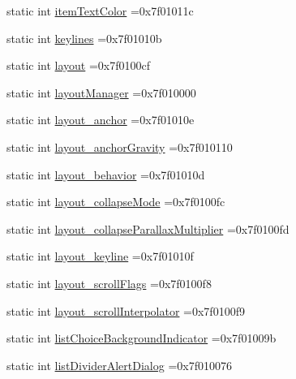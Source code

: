 \begin{DoxyCompactItemize}
\item 
static int \hyperlink{classandroid_1_1support_1_1v4_1_1R_1_1attr_a4281f0a5c0d3ca403f692457be471fe7}{item\+Text\+Color} =0x7f01011c
\item 
static int \hyperlink{classandroid_1_1support_1_1v4_1_1R_1_1attr_a268b3fabe0ef0d9222f43931b0af5d39}{keylines} =0x7f01010b
\item 
static int \hyperlink{classandroid_1_1support_1_1v4_1_1R_1_1attr_a0bf2f94b527cc15b68bf05ba0e93849d}{layout} =0x7f0100cf
\item 
static int \hyperlink{classandroid_1_1support_1_1v4_1_1R_1_1attr_aab150bb5cac4951599a91c59ac183ee5}{layout\+Manager} =0x7f010000
\item 
static int \hyperlink{classandroid_1_1support_1_1v4_1_1R_1_1attr_a1bdef82525d3965c0bfa3c87fa463972}{layout\+\_\+anchor} =0x7f01010e
\item 
static int \hyperlink{classandroid_1_1support_1_1v4_1_1R_1_1attr_a7b903ff169eccd661e399a2c828c411c}{layout\+\_\+anchor\+Gravity} =0x7f010110
\item 
static int \hyperlink{classandroid_1_1support_1_1v4_1_1R_1_1attr_ab0d50824521c62d51d34bec6a94acc92}{layout\+\_\+behavior} =0x7f01010d
\item 
static int \hyperlink{classandroid_1_1support_1_1v4_1_1R_1_1attr_aa4465fd35e82a6ccfec13236de2e46fc}{layout\+\_\+collapse\+Mode} =0x7f0100fc
\item 
static int \hyperlink{classandroid_1_1support_1_1v4_1_1R_1_1attr_a580876bd2ce4e2bd2d19c57ed9f91af1}{layout\+\_\+collapse\+Parallax\+Multiplier} =0x7f0100fd
\item 
static int \hyperlink{classandroid_1_1support_1_1v4_1_1R_1_1attr_aa53f79e9969f32f33d11ad397f0b687b}{layout\+\_\+keyline} =0x7f01010f
\item 
static int \hyperlink{classandroid_1_1support_1_1v4_1_1R_1_1attr_afe433c5f79342959f5c95f8fa7335ec2}{layout\+\_\+scroll\+Flags} =0x7f0100f8
\item 
static int \hyperlink{classandroid_1_1support_1_1v4_1_1R_1_1attr_a879822f9c1ac12993c96e025796ef13d}{layout\+\_\+scroll\+Interpolator} =0x7f0100f9
\item 
static int \hyperlink{classandroid_1_1support_1_1v4_1_1R_1_1attr_af7eefe308947e12a94677f65e23aff36}{list\+Choice\+Background\+Indicator} =0x7f01009b
\item 
static int \hyperlink{classandroid_1_1support_1_1v4_1_1R_1_1attr_af03f26f416a7488e6cc6869ead2e96c7}{list\+Divider\+Alert\+Dialog} =0x7f010076
\item 

\end{DoxyCompactItemize}
